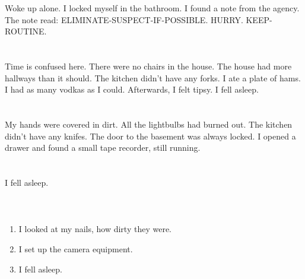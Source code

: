 \documentclass{article}
\begin{document}
    \section{}
    Woke up alone. I locked myself in the bathroom. I found a note from the agency. The note read: ELIMINATE-SUSPECT-IF-POSSIBLE. HURRY. KEEP-ROUTINE.  
    \newpage
    
    \section{}
    Time is confused here. There were no chairs in the house. The house had more hallways than it should. The kitchen didn't have any forks. I ate a plate of hams. I had as many vodkas as I could. Afterwards, I felt tipsy. I fell asleep.  
    \newpage
    
    \section{}
    My hands were covered in dirt. All the lightbulbs had burned out. The kitchen didn't have any knifes. The door to the basement was always locked. I opened a drawer and found a small tape recorder, still running.  
    \newpage
    
    \section{}
    I fell asleep.\\\\ 
    \newpage
    
    \section{}
    
    \begin{enumerate}
    
    \item I looked at my nails, how dirty they were.\\
    
    \item I set up the camera equipment.\\
    
    \item I fell asleep.\\
    
    \end{enumerate}
     
    \newpage
    
\end{document}

